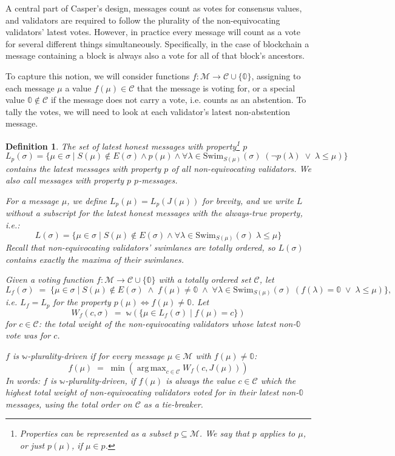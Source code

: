 \documentclass[12pt]{article}
\newtheorem{definition}{Definition}
\DeclareMathOperator*{\argmax}{arg\,max}
\begin{document}
A central part of Casper's design,  messages count as votes for consensus values, and validators are required to follow the plurality of the non-equivocating validators' latest votes. However, in practice every message will count as a vote for several different things simultaneously. Specifically, in the case of blockchain a message containing a block is always also a vote for all of that block's ancestors.

To capture this notion, we will consider functions $f: \mathcal{M} \rightarrow \mathcal{C} \cup \{ \mathbb{0} \}$, assigning to each message $\mu$ a value $f(\mu) \in \mathcal{C}$ that the message is voting for, or a special value $\mathbb{0} \notin \mathcal{C}$ if the message does not carry a vote, i.e. counts as an abstention. To tally the votes, we will need to look at each validator's latest non-abstention message.

\begin{definition}
The set of \emph{latest honest messages with property\footnote{Properties can be represented as a subset $p \subseteq \mathcal{M}$. We say that $p$ \emph{applies to $\mu$}, or just $p(\mu)$, if $\mu \in p$.} $p$}
  $$L_p(\sigma) = \{ \mu \in \sigma \mid S(\mu) \notin E(\sigma) \wedge p(\mu) \wedge \forall \lambda \in \mathrm{Swim}_{S(\mu)}(\sigma)\; (\neg p(\lambda) \;\vee\; \lambda \leq \mu) \}$$
contains the latest messages with property $p$ of all non-equivocating validators. We also call messages with property $p$ \emph{$p$-messages}.

  For a message $\mu$, we define $L_p(\mu) = L_p(J(\mu))$ for brevity, and we write $L$ without a subscript for the latest honest messages with the always-true property, i.e.:
  $$L(\sigma) = \{ \mu \in \sigma \mid S(\mu) \notin E(\sigma) \wedge \forall \lambda \in \mathrm{Swim}_{S(\mu)}(\sigma)\; \lambda \leq \mu \}$$
Recall that non-equivocating validators' swimlanes are totally ordered, so $L(\sigma)$ contains exactly the maxima of their swimlanes.

  Given a voting function $f: \mathcal{M} \rightarrow \mathcal{C} \cup \{ \mathbb{0} \}$ with a totally ordered set $\mathcal{C}$, let
  $$L_f(\sigma) \;=\; \{ \mu \in \sigma \mid S(\mu) \notin E(\sigma) \;\wedge\; f(\mu) \neq \mathbb{0} \;\wedge\; \forall \lambda \in \mathrm{Swim}_{S(\mu)}(\sigma)\; (f(\lambda) = \mathbb{0} \;\vee\; \lambda \leq \mu) \}\text{,}$$
  i.e. $L_f = L_p$ for the property $p(\mu) \Leftrightarrow f(\mu) \neq \mathbb{0}$. Let
  $$W_f(c, \sigma) \;=\; \mathbb{w}(\{ \mu \in L_f(\sigma) \mid f(\mu) = c\})$$
  for $c \in \mathcal{C}$: the total weight of the non-equivocating validators whose latest non-$\mathbb{0}$ vote was for $c$.

  $f$ is \emph{$\mathbb{w}$-plurality-driven} if for every message $\mu \in \mathcal{M}$ with $f(\mu) \neq \mathbb{0}$:
  $$f(\mu) \;=\; \min \left(\argmax_{c \in \mathcal{C}} W_f(c, J(\mu))\right)$$
  In words: $f$ is $\mathbb{w}$-plurality-driven, if $f(\mu)$ is always the value $c \in \mathcal{C}$ which the highest total weight of non-equivocating validators voted for in their latest non-$\mathbb{0}$ messages, using the total order on $\mathcal{C}$ as a tie-breaker.
\end{definition}
\end{document}
